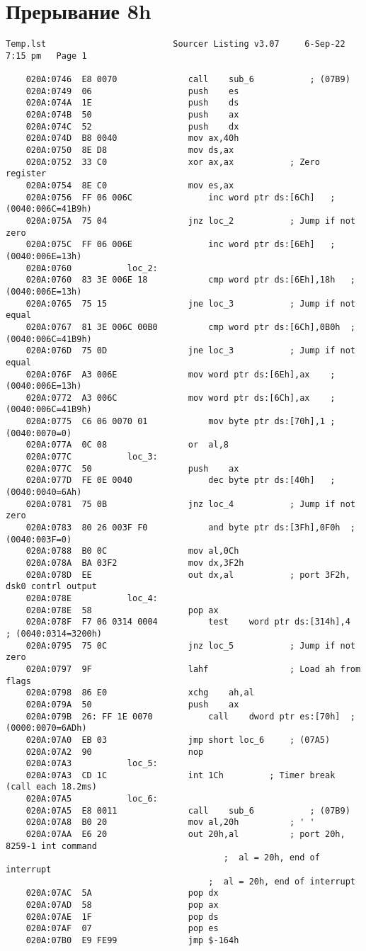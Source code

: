 \documentclass[a4paper,12pt]{bmstu}
\begin{document}
\section{Прерывание 8h}\label{sec:Dis_int}
\begin{lstlisting}[style={asm},label={lst:INT8H}]
    Temp.lst						 Sourcer Listing v3.07     6-Sep-22   7:15 pm   Page 1

    020A:0746  E8 0070				call	sub_6			; (07B9)
    020A:0749  06					push	es
    020A:074A  1E					push	ds
    020A:074B  50					push	ax
    020A:074C  52					push	dx
    020A:074D  B8 0040				mov	ax,40h
    020A:0750  8E D8				mov	ds,ax
    020A:0752  33 C0				xor	ax,ax			; Zero register
    020A:0754  8E C0				mov	es,ax
    020A:0756  FF 06 006C				inc	word ptr ds:[6Ch]	; (0040:006C=41B9h)
    020A:075A  75 04				jnz	loc_2			; Jump if not zero
    020A:075C  FF 06 006E				inc	word ptr ds:[6Eh]	; (0040:006E=13h)
    020A:0760			loc_2:
    020A:0760  83 3E 006E 18			cmp	word ptr ds:[6Eh],18h	; (0040:006E=13h)
    020A:0765  75 15				jne	loc_3			; Jump if not equal
    020A:0767  81 3E 006C 00B0			cmp	word ptr ds:[6Ch],0B0h	; (0040:006C=41B9h)
    020A:076D  75 0D				jne	loc_3			; Jump if not equal
    020A:076F  A3 006E				mov	word ptr ds:[6Eh],ax	; (0040:006E=13h)
    020A:0772  A3 006C				mov	word ptr ds:[6Ch],ax	; (0040:006C=41B9h)
    020A:0775  C6 06 0070 01			mov	byte ptr ds:[70h],1	; (0040:0070=0)
    020A:077A  0C 08				or	al,8
    020A:077C			loc_3:
    020A:077C  50					push	ax
    020A:077D  FE 0E 0040				dec	byte ptr ds:[40h]	; (0040:0040=6Ah)
    020A:0781  75 0B				jnz	loc_4			; Jump if not zero
    020A:0783  80 26 003F F0			and	byte ptr ds:[3Fh],0F0h	; (0040:003F=0)
    020A:0788  B0 0C				mov	al,0Ch
    020A:078A  BA 03F2				mov	dx,3F2h
    020A:078D  EE					out	dx,al			; port 3F2h, dsk0 contrl output
    020A:078E			loc_4:
    020A:078E  58					pop	ax
    020A:078F  F7 06 0314 0004			test	word ptr ds:[314h],4	; (0040:0314=3200h)
    020A:0795  75 0C				jnz	loc_5			; Jump if not zero
    020A:0797  9F					lahf				; Load ah from flags
    020A:0798  86 E0				xchg	ah,al
    020A:079A  50					push	ax
    020A:079B  26: FF 1E 0070			call	dword ptr es:[70h]	; (0000:0070=6ADh)
    020A:07A0  EB 03				jmp	short loc_6		; (07A5)
    020A:07A2  90					nop
    020A:07A3			loc_5:
    020A:07A3  CD 1C				int	1Ch			; Timer break (call each 18.2ms)
    020A:07A5			loc_6:
    020A:07A5  E8 0011				call	sub_6			; (07B9)
    020A:07A8  B0 20				mov	al,20h			; ' '
    020A:07AA  E6 20				out	20h,al			; port 20h, 8259-1 int command
                                           ;  al = 20h, end of interrupt
										;  al = 20h, end of interrupt
    020A:07AC  5A					pop	dx
    020A:07AD  58					pop	ax
    020A:07AE  1F					pop	ds
    020A:07AF  07					pop	es
    020A:07B0  E9 FE99				jmp	$-164h

\end{lstlisting}
\clearpage
\end{document}
